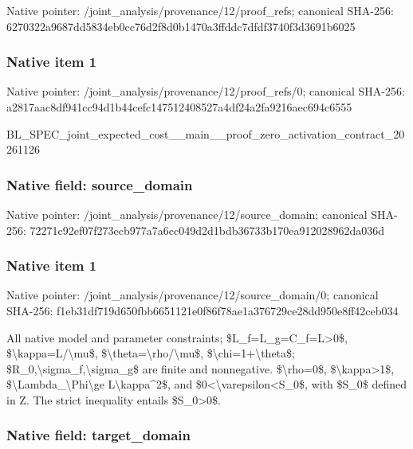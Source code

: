 \documentclass[10pt,a4paper]{article}
\begin{document}
Native pointer: /joint\_analysis/provenan\allowbreak{}ce/12/proof\_refs; canonical SHA-256: 6270322a9687dd5834eb0cc7\allowbreak{}6d2f8d0b1470a3ffddc7dfdf\allowbreak{}3740f3d3691b6025



\subsubsection{Native item 1}


Native pointer: /joint\_analysis/provenan\allowbreak{}ce/12/proof\_refs/0; canonical SHA-256: a2817aac8df941cc94d1b44c\allowbreak{}efc147512408527a4df24a2f\allowbreak{}a9216aec694c6555


BL\_SPEC\_joint\_expected\_c\allowbreak{}ost\_\_main\_\_proof\_zero\_ac\allowbreak{}tivation\_contract\_202611\allowbreak{}26


\subsubsection{Native field: source\_domain}


Native pointer: /joint\_analysis/provenan\allowbreak{}ce/12/source\_domain; canonical SHA-256: 72271c92ef07f273ecb977a7\allowbreak{}a6cc049d2d1bdb36733b170e\allowbreak{}a912028962da036d



\subsubsection{Native item 1}


Native pointer: /joint\_analysis/provenan\allowbreak{}ce/12/source\_domain/0; canonical SHA-256: f1eb31df719d650fbb665112\allowbreak{}1e0f86f78ae1a376729ce28d\allowbreak{}d950e8ff42ceb034


All native model and parameter constraints; \$L\_f=L\_g=C\_f=L>0\$, \$\textbackslash{}kappa=L/\textbackslash{}mu\$, \$\textbackslash{}theta=\textbackslash{}rho/\textbackslash{}mu\$, \$\textbackslash{}chi=1+\textbackslash{}theta\$; \$R\_0,\textbackslash{}sigma\_f,\textbackslash{}sigma\_g\$ are finite and nonnegative. \$\textbackslash{}rho=0\$, \$\textbackslash{}kappa>1\$, \$\textbackslash{}Lambda\_\textbackslash{}Phi\textbackslash{}ge L\textbackslash{}kappa\textasciicircum{}2\$, and \$0<\textbackslash{}varepsilon<S\_0\$, with \$S\_0\$ defined in Z. The strict inequality entails \$S\_0>0\$.


\subsubsection{Native field: target\_domain}
\end{document}
